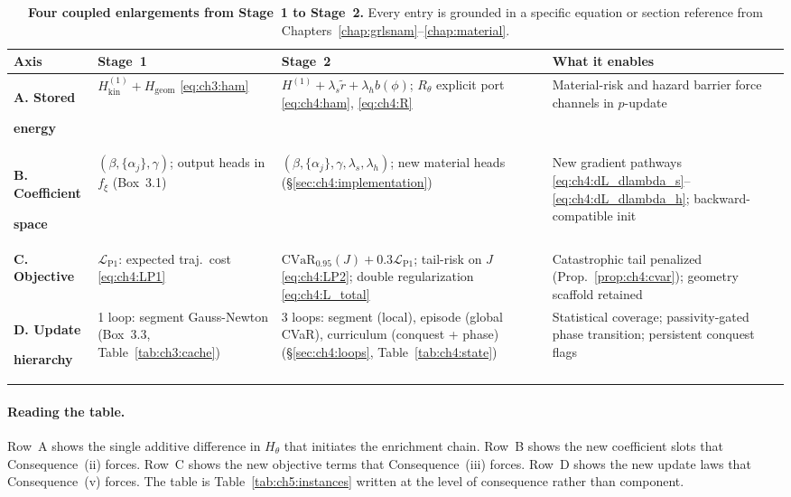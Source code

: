 \begin{table}[t]
\centering
\caption{%
  \textbf{Four coupled enlargements from Stage~1 to Stage~2.}
  Every entry is grounded in a specific equation or section
  reference from Chapters~\ref{chap:grlsnam}--\ref{chap:material}.
}
\label{tab:ch5:enlargements}
\small
\setlength{\tabcolsep}{4pt}
\renewcommand{\arraystretch}{1.4}
\begin{tabular}{p{2.2cm}p{3.8cm}p{3.8cm}p{3.0cm}}
\toprule
\textbf{Axis} &
\textbf{Stage~1} &
\textbf{Stage~2} &
\textbf{What it enables} \\
\midrule
\textbf{A. Stored}\par\textbf{energy}
  & $H^{(1)}_{\mathrm{kin}} + H_{\mathrm{geom}}$
    \eqref{eq:ch3:ham}
  & $H^{(1)} + \lambda_s\tilde{r} + \lambda_h b(\phi)$;\;
    $R_\theta$ explicit port
    \eqref{eq:ch4:ham}, \eqref{eq:ch4:R}
  & Material-risk and hazard barrier force channels in $p$-update \\
\midrule
\textbf{B. Coefficient}\par\textbf{space}
  & $(\beta,\{\alpha_j\},\gamma)$;\;
    3 output heads in $f_\xi$
    (Box~3.1)
  & $(\beta,\{\alpha_j\},\gamma,\lambda_s,\lambda_h)$;\;
    2 new material heads
    (\S\ref{sec:ch4:implementation})
  & New gradient pathways \eqref{eq:ch4:dL_dlambda_s}--\eqref{eq:ch4:dL_dlambda_h};
    backward-compatible init \\
\midrule
\textbf{C. Objective}
  & $\mathcal{L}_{\mathrm{P1}}$: expected traj.\ cost
    \eqref{eq:ch4:LP1}
  & $\mathrm{CVaR}_{0.95}(J) + 0.3\mathcal{L}_{\mathrm{P1}}$;\;
    tail-risk on $J$ \eqref{eq:ch4:LP2};\;
    double regularization \eqref{eq:ch4:L_total}
  & Catastrophic tail penalized (Prop.~\ref{prop:ch4:cvar});
    geometry scaffold retained \\
\midrule
\textbf{D. Update}\par\textbf{hierarchy}
  & 1 loop: segment Gauss-Newton
    (Box~3.3, Table~\ref{tab:ch3:cache})
  & 3 loops: segment (local), episode (global CVaR),
    curriculum (conquest + phase)
    (\S\ref{sec:ch4:loops}, Table~\ref{tab:ch4:state})
  & Statistical coverage; passivity-gated phase transition;
    persistent conquest flags \\
\bottomrule
\end{tabular}
\end{table}

\paragraph{Reading the table.}
Row~A shows the single additive difference in $H_\theta$ that
initiates the enrichment chain.
Row~B shows the new coefficient slots that Consequence~(ii) forces.
Row~C shows the new objective terms that Consequence~(iii) forces.
Row~D shows the new update laws that Consequence~(v) forces.
The table is Table~\ref{tab:ch5:instances} written at the level of
consequence rather than component.

